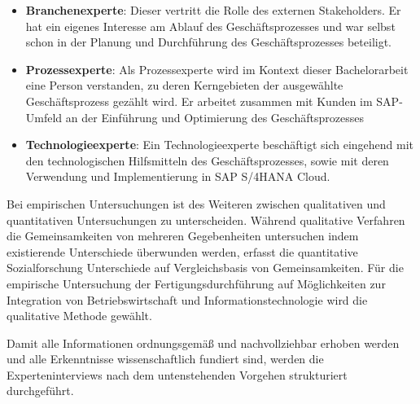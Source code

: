 \begin{itemize}
    \item 
    \textbf{Branchenexperte}: Dieser vertritt die Rolle des externen Stakeholders. Er hat ein eigenes Interesse am Ablauf des Geschäftsprozesses und war selbst schon in der Planung und Durchführung des Geschäftsprozesses beteiligt. 
    \item
    \textbf{Prozessexperte}: Als Prozessexperte wird im Kontext dieser Bachelorarbeit eine Person verstanden, zu deren Kerngebieten der ausgewählte Geschäftsprozess gezählt wird. Er arbeitet zusammen mit Kunden im SAP-Umfeld an der Einführung und Optimierung des Geschäftsprozesses
    \item
    \textbf{Technologieexperte}:  Ein Technologieexperte beschäftigt sich eingehend mit den technologischen Hilfsmitteln des Geschäftsprozesses, sowie mit deren Verwendung und Implementierung in SAP S/4HANA Cloud.
\end{itemize}

Bei empirischen Untersuchungen ist des Weiteren zwischen qualitativen und quantitativen Untersuchungen zu unterscheiden. Während qualitative Verfahren die Gemeinsamkeiten von mehreren Gegebenheiten untersuchen indem existierende Unterschiede überwunden werden, erfasst die quantitative Sozialforschung Unterschiede auf Vergleichsbasis von Gemeinsamkeiten. Für die empirische Untersuchung der Fertigungsdurchführung auf Möglichkeiten zur Integration von Betriebswirtschaft und Informationstechnologie wird die qualitative Methode gewählt. 

Damit alle Informationen ordnungsgemäß und nachvollziehbar erhoben werden und alle Erkenntnisse wissenschaftlich fundiert sind, werden die Experteninterviews nach dem untenstehenden Vorgehen strukturiert durchgeführt.

